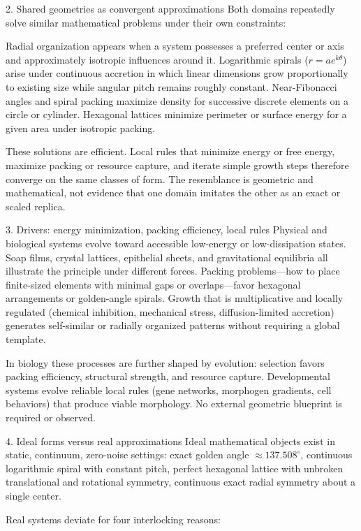 2. Shared geometries as convergent approximations
Both domains repeatedly solve similar mathematical problems under their own constraints:

Radial organization appears when a system possesses a preferred center or axis and approximately isotropic influences around it.
Logarithmic spirals (\(r = a e^{k\theta}\)) arise under continuous accretion in which linear dimensions grow proportionally to existing size while angular pitch remains roughly constant.
Near-Fibonacci angles and spiral packing maximize density for successive discrete elements on a circle or cylinder.
Hexagonal lattices minimize perimeter or surface energy for a given area under isotropic packing.

These solutions are efficient. Local rules that minimize energy or free energy, maximize packing or resource capture, and iterate simple growth steps therefore converge on the same classes of form. The resemblance is geometric and mathematical, not evidence that one domain imitates the other as an exact or scaled replica.

3. Drivers: energy minimization, packing efficiency, local rules
Physical and biological systems evolve toward accessible low-energy or low-dissipation states. Soap films, crystal lattices, epithelial sheets, and gravitational equilibria all illustrate the principle under different forces. Packing problems—how to place finite-sized elements with minimal gaps or overlaps—favor hexagonal arrangements or golden-angle spirals. Growth that is multiplicative and locally regulated (chemical inhibition, mechanical stress, diffusion-limited accretion) generates self-similar or radially organized patterns without requiring a global template.

In biology these processes are further shaped by evolution: selection favors packing efficiency, structural strength, and resource capture. Developmental systems evolve reliable local rules (gene networks, morphogen gradients, cell behaviors) that produce viable morphology. No external geometric blueprint is required or observed.

4. Ideal forms versus real approximations
Ideal mathematical objects exist in static, continuum, zero-noise settings:
exact golden angle \(\approx 137.508^\circ\),
continuous logarithmic spiral with constant pitch,
perfect hexagonal lattice with unbroken translational and rotational symmetry,
continuous exact radial symmetry about a single center.

Real systems deviate for four interlocking reasons:

